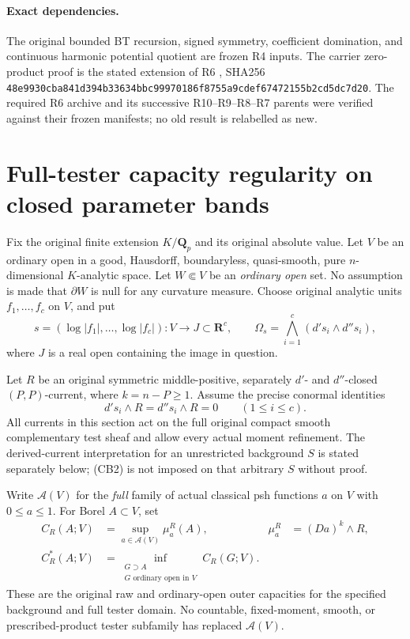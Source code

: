 \documentclass[11pt,a4paper]{article}
\numberwithin{equation}{section}
\theoremstyle{definition}
\theoremstyle{remark}
\begin{document}
\paragraph{Exact dependencies.}
The original bounded BT recursion, signed symmetry, coefficient
domination, and continuous harmonic potential quotient are frozen
R4 inputs. The carrier zero-product proof is the stated extension
of R6 , SHA256
{\small\nolinkurl{48e9930cba841d394b33634bbc99970186f8755a9cdef67472155b2cd5dc7d20}}.
The required R6 archive and its successive R10--R9--R8--R7 parents
were verified against their frozen manifests; no old result is
relabelled as new.



\section{Full-tester capacity regularity on closed parameter bands}
\label{sec:r12-closed-band-capacity}

Fix the original finite extension $K/\mathbf Q_p$ and its original
absolute value. Let $V$ be an ordinary open in a good, Hausdorff,
boundaryless, quasi-smooth, pure $n$-dimensional $K$-analytic space.
Let $W\Subset V$ be an \emph{ordinary open} set. No assumption is
made that $\partial W$ is null for any curvature measure. Choose
original analytic units $f_1,\ldots,f_c$ on $V$, and put
\[
 s=(\log|f_1|,\ldots,\log|f_c|):V\longrightarrow J\subset\mathbf R^c,
 \qquad \Omega_s=\bigwedge_{i=1}^c(d's_i\wedge d''s_i),
 \tag{CB1}
\]
where $J$ is a real open containing the image in question.

Let $R$ be an original symmetric middle-positive, separately
$d'$- and $d''$-closed $(P,P)$-current, where
$k=n-P\geq1$. Assume the precise conormal identities
\[
                    d's_i\wedge R=d''s_i\wedge R=0
                                  \qquad(1\leq i\leq c).
 \tag{CB2}
\]
All currents in this section act on the full original compact
smooth complementary test sheaf and allow every actual moment
refinement. The derived-current interpretation for an unrestricted
background $S$ is stated separately below; (CB2) is not imposed
on that arbitrary $S$ without proof.

Write $\mathcal A(V)$ for the \emph{full} family of actual
classical psh functions $a$ on $V$ with $0\leq a\leq1$.
For Borel $A\subset V$, set
\[
 \begin{aligned}
 C_R(A;V)&=\sup_{a\in\mathcal A(V)}\mu^R_a(A),
       &\mu^R_a&=(Da)^k\wedge R,\\
 C_R^*(A;V)&=\inf_{\substack{G\supset A\\G\text{ ordinary open in }V}}
                                                C_R(G;V).
 \end{aligned}
 \tag{CB3}
\]
These are the original raw and ordinary-open outer capacities
for the specified background and full tester domain. No countable,
fixed-moment, smooth, or prescribed-product tester subfamily has
replaced $\mathcal A(V)$.
\end{document}
